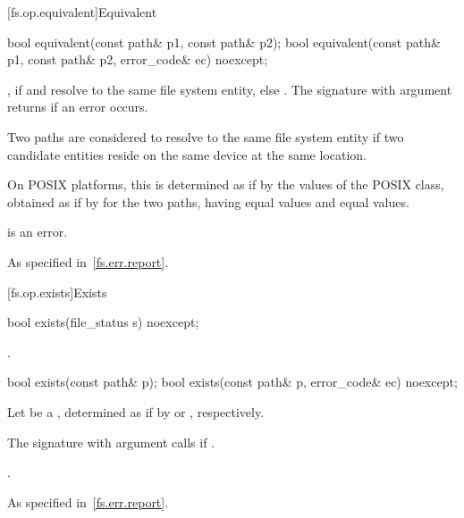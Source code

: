 [fs.op.equivalent]{Equivalent}

%
\begin{itemdecl}
bool equivalent(const path& p1, const path& p2);
bool equivalent(const path& p1, const path& p2, error_code& ec) noexcept;
\end{itemdecl}

\begin{itemdescr}
\pnum
\returns {}, if  and  resolve to the same file
  system entity, else . The signature with argument 
  returns  if an error occurs.

\pnum
Two paths are considered to resolve to the same file system entity if two
  candidate entities reside on the same device at the same location.
  \begin{note}
  On POSIX platforms, this is
  determined as if by the values of the POSIX  class,
  obtained as if by  for the two paths, having equal  values
  and equal  values.
  \end{note}

\pnum
\remarks {} is an error.

\pnum
\throws As specified in~\ref{fs.err.report}.
\end{itemdescr}


[fs.op.exists]{Exists}

%
\begin{itemdecl}
bool exists(file_status s) noexcept;
\end{itemdecl}

\begin{itemdescr}
\pnum
\returns {}.
\end{itemdescr}

%
\begin{itemdecl}
bool exists(const path& p);
bool exists(const path& p, error_code& ec) noexcept;
\end{itemdecl}

\begin{itemdescr}
\pnum
Let  be a ,
determined as if by  or , respectively.

\pnum
\effects The signature with argument  calls 
if .

\pnum
\returns {}.

\pnum
\throws As specified in~\ref{fs.err.report}.
\end{itemdescr}


